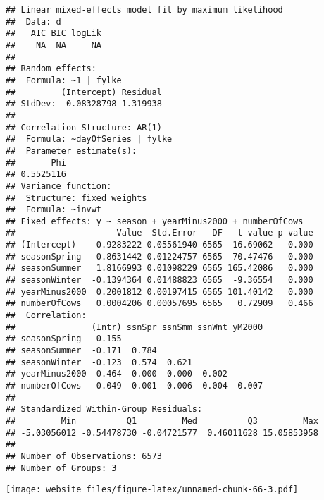 \documentclass[]{book}
\newenvironment{Shaded}{\begin{snugshade}}{\end{snugshade}}
\newcommand{\KeywordTok}[1]{\textcolor[rgb]{0.13,0.29,0.53}{\textbf{#1}}}
\newcommand{\DataTypeTok}[1]{\textcolor[rgb]{0.13,0.29,0.53}{#1}}
\newcommand{\StringTok}[1]{\textcolor[rgb]{0.31,0.60,0.02}{#1}}
\newcommand{\OperatorTok}[1]{\textcolor[rgb]{0.81,0.36,0.00}{\textbf{#1}}}
\newcommand{\ErrorTok}[1]{\textcolor[rgb]{0.64,0.00,0.00}{\textbf{#1}}}
\newcommand{\NormalTok}[1]{#1}
\begin{document}
\begin{verbatim}
## Linear mixed-effects model fit by maximum likelihood
##  Data: d 
##   AIC BIC logLik
##    NA  NA     NA
## 
## Random effects:
##  Formula: ~1 | fylke
##         (Intercept) Residual
## StdDev:  0.08328798 1.319938
## 
## Correlation Structure: AR(1)
##  Formula: ~dayOfSeries | fylke 
##  Parameter estimate(s):
##       Phi 
## 0.5525116 
## Variance function:
##  Structure: fixed weights
##  Formula: ~invwt 
## Fixed effects: y ~ season + yearMinus2000 + numberOfCows 
##                    Value  Std.Error   DF   t-value p-value
## (Intercept)    0.9283222 0.05561940 6565  16.69062   0.000
## seasonSpring   0.8631442 0.01224757 6565  70.47476   0.000
## seasonSummer   1.8166993 0.01098229 6565 165.42086   0.000
## seasonWinter  -0.1394364 0.01488823 6565  -9.36554   0.000
## yearMinus2000  0.2001812 0.00197415 6565 101.40142   0.000
## numberOfCows   0.0004206 0.00057695 6565   0.72909   0.466
##  Correlation: 
##               (Intr) ssnSpr ssnSmm ssnWnt yM2000
## seasonSpring  -0.155                            
## seasonSummer  -0.171  0.784                     
## seasonWinter  -0.123  0.574  0.621              
## yearMinus2000 -0.464  0.000  0.000 -0.002       
## numberOfCows  -0.049  0.001 -0.006  0.004 -0.007
## 
## Standardized Within-Group Residuals:
##         Min          Q1         Med          Q3         Max 
## -5.03056012 -0.54478730 -0.04721577  0.46011628 15.05853958 
## 
## Number of Observations: 6573
## Number of Groups: 3
\end{verbatim}

\begin{Shaded}
\end{Shaded}

\texttt{[image: website\_files/figure-latex/unnamed-chunk-66-3.pdf]}

\begin{Shaded}
\end{Shaded}
\end{document}

